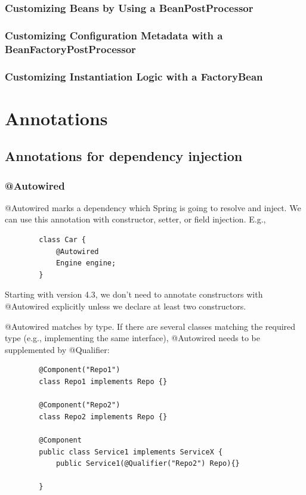 \documentclass{scrartcl}
\begin{document}
\subsubsection{Customizing Beans by Using a BeanPostProcessor}

\subsubsection{Customizing Configuration Metadata with a BeanFactoryPostProcessor}

\subsubsection{Customizing Instantiation Logic with a FactoryBean}

\section{Annotations}
\subsection{Annotations for dependency injection}
\subsubsection{@Autowired}
    @Autowired marks a dependency which Spring is going to resolve and inject. We can use this annotation with constructor, setter, or field injection. E.g.,

    \begin{lstlisting}
        class Car {
            @Autowired
            Engine engine;
        }
    \end{lstlisting}

    Starting with version 4.3, we don’t need to annotate constructors with @Autowired explicitly unless we declare at least two constructors.

    @Autowired matches by type. If there are several classes matching the required type (e.g., implementing the same interface), @Autowired needs to be supplemented by @Qualifier:

    \begin{lstlisting}
        @Component("Repo1")
        class Repo1 implements Repo {}

        @Component("Repo2")
        class Repo2 implements Repo {}

        @Component
        public class Service1 implements ServiceX {
            public Service1(@Qualifier("Repo2") Repo){}

        }

    \end{lstlisting}
\end{document}
